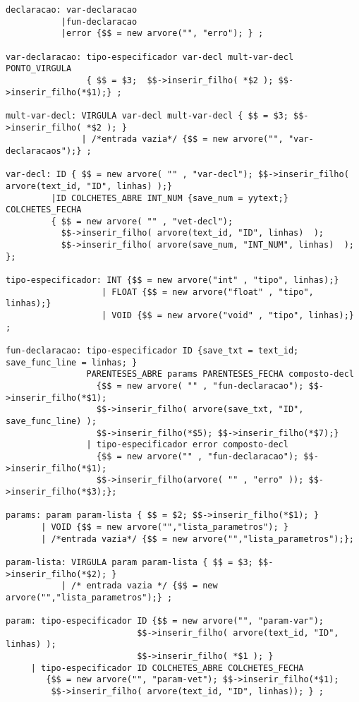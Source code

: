 \begin{lstlisting}
declaracao: var-declaracao
           |fun-declaracao 
           |error {$$ = new arvore("", "erro"); } ;

var-declaracao: tipo-especificador var-decl mult-var-decl PONTO_VIRGULA
                { $$ = $3;  $$->inserir_filho( *$2 ); $$->inserir_filho(*$1);} ;

mult-var-decl: VIRGULA var-decl mult-var-decl { $$ = $3; $$->inserir_filho( *$2 ); }
               | /*entrada vazia*/ {$$ = new arvore("", "var-declaracaos");} ;

var-decl: ID { $$ = new arvore( "" , "var-decl"); $$->inserir_filho( arvore(text_id, "ID", linhas) );}
         |ID COLCHETES_ABRE INT_NUM {save_num = yytext;} COLCHETES_FECHA
         { $$ = new arvore( "" , "vet-decl"); 
           $$->inserir_filho( arvore(text_id, "ID", linhas)  );
           $$->inserir_filho( arvore(save_num, "INT_NUM", linhas)  ); };

tipo-especificador: INT {$$ = new arvore("int" , "tipo", linhas);}
                   | FLOAT {$$ = new arvore("float" , "tipo", linhas);}
                   | VOID {$$ = new arvore("void" , "tipo", linhas);} ;

fun-declaracao: tipo-especificador ID {save_txt = text_id; save_func_line = linhas; }
                PARENTESES_ABRE params PARENTESES_FECHA composto-decl
                  {$$ = new arvore( "" , "fun-declaracao"); $$->inserir_filho(*$1);
                  $$->inserir_filho( arvore(save_txt, "ID", save_func_line) );
                  $$->inserir_filho(*$5); $$->inserir_filho(*$7);}
                | tipo-especificador error composto-decl
                  {$$ = new arvore("" , "fun-declaracao"); $$->inserir_filho(*$1);
                  $$->inserir_filho(arvore( "" , "erro" )); $$->inserir_filho(*$3);};

params: param param-lista { $$ = $2; $$->inserir_filho(*$1); }
       | VOID {$$ = new arvore("","lista_parametros"); }
       | /*entrada vazia*/ {$$ = new arvore("","lista_parametros");};

param-lista: VIRGULA param param-lista { $$ = $3; $$->inserir_filho(*$2); }
           | /* entrada vazia */ {$$ = new arvore("","lista_parametros");} ;

param: tipo-especificador ID {$$ = new arvore("", "param-var"); 
                          $$->inserir_filho( arvore(text_id, "ID", linhas) );
                          $$->inserir_filho( *$1 ); }
     | tipo-especificador ID COLCHETES_ABRE COLCHETES_FECHA
        {$$ = new arvore("", "param-vet"); $$->inserir_filho(*$1); 
         $$->inserir_filho( arvore(text_id, "ID", linhas)); } ;


\end{lstlisting}
